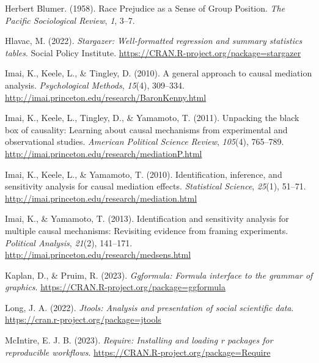 \documentclass[
  man,floatsintext]{apa7}
\newlength{\cslhangindent}
\newlength{\cslentryspacingunit} %
\newenvironment{CSLReferences}[2] %
 {%
  \setlength{\parindent}{0pt}
  \ifodd #1
  \let\oldpar\par
  \def\par{\hangindent=\cslhangindent\oldpar}
  \fi
  \setlength{\parskip}{#2\cslentryspacingunit}
 }%
 {}
\begin{document}
\begin{CSLReferences}{1}{0}
\leavevmode{}%
Herbert Blumer. (1958). Race {Prejudice} as a {Sense} of {Group Position}. \emph{The Pacific Sociological Review}, \emph{1}, 3--7.

\leavevmode{}%
Hlavac, M. (2022). \emph{Stargazer: Well-formatted regression and summary statistics tables}. Social Policy Institute. \url{https://CRAN.R-project.org/package=stargazer}

\leavevmode{}%
Imai, K., Keele, L., \& Tingley, D. (2010). A general approach to causal mediation analysis. \emph{Psychological Methods}, \emph{15}(4), 309--334. \url{http://imai.princeton.edu/research/BaronKenny.html}

\leavevmode{}%
Imai, K., Keele, L., Tingley, D., \& Yamamoto, T. (2011). Unpacking the black box of causality: Learning about causal mechanisms from experimental and observational studies. \emph{American Political Science Review}, \emph{105}(4), 765--789. \url{http://imai.princeton.edu/research/mediationP.html}

\leavevmode{}%
Imai, K., Keele, L., \& Yamamoto, T. (2010). Identification, inference, and sensitivity analysis for causal mediation effects. \emph{Statistical Science}, \emph{25}(1), 51--71. \url{http://imai.princeton.edu/research/mediation.html}

\leavevmode{}%
Imai, K., \& Yamamoto, T. (2013). Identification and sensitivity analysis for multiple causal mechanisms: Revisiting evidence from framing experiments. \emph{Political Analysis}, \emph{21}(2), 141--171. \url{http://imai.princeton.edu/research/medsens.html}

\leavevmode{}%
Kaplan, D., \& Pruim, R. (2023). \emph{Ggformula: Formula interface to the grammar of graphics}. \url{https://CRAN.R-project.org/package=ggformula}

\leavevmode{}%
Long, J. A. (2022). \emph{Jtools: Analysis and presentation of social scientific data}. \url{https://cran.r-project.org/package=jtools}

\leavevmode{}%
McIntire, E. J. B. (2023). \emph{Require: Installing and loading r packages for reproducible workflows}. \url{https://CRAN.R-project.org/package=Require}


\end{CSLReferences}
\end{document}

